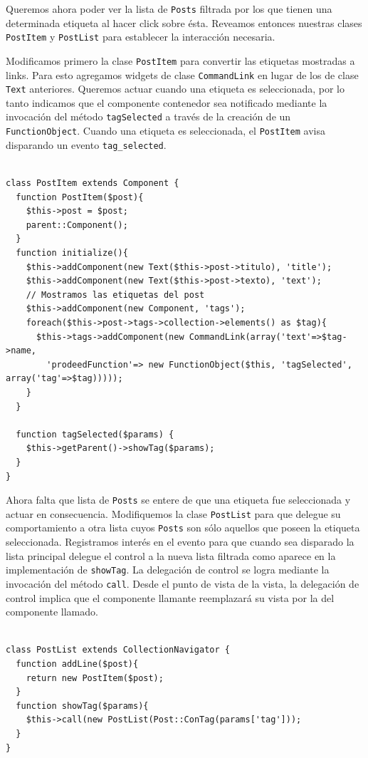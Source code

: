 Queremos ahora poder ver la lista de \verb"Posts" filtrada por los que tienen una determinada etiqueta al hacer click sobre ésta. Reveamos entonces nuestras clases \verb"PostItem" y \verb"PostList" para establecer la interacción necesaria.

Modificamos primero la clase \verb"PostItem" para convertir las etiquetas mostradas a links. Para esto agregamos widgets de clase \verb"CommandLink" en lugar de los de clase \verb"Text" anteriores. Queremos actuar cuando una etiqueta es seleccionada, por lo tanto indicamos que el componente contenedor sea notificado mediante la invocación del método \verb"tagSelected" a través de la creación de un \verb"FunctionObject". Cuando una etiqueta es seleccionada, el \verb"PostItem" avisa disparando  un evento \verb"tag_selected".

\begin{verbatim}

class PostItem extends Component {
  function PostItem($post){
    $this->post = $post;
    parent::Component();
  }
  function initialize(){
    $this->addComponent(new Text($this->post->titulo), 'title');
    $this->addComponent(new Text($this->post->texto), 'text');
    // Mostramos las etiquetas del post
    $this->addComponent(new Component, 'tags');
    foreach($this->post->tags->collection->elements() as $tag){
      $this->tags->addComponent(new CommandLink(array('text'=>$tag->name,
        'prodeedFunction'=> new FunctionObject($this, 'tagSelected', array('tag'=>$tag)))));
    }
  }

  function tagSelected($params) {
    $this->getParent()->showTag($params);
  }
}

\end{verbatim}

Ahora falta que lista de \verb"Posts" se entere de que una etiqueta fue seleccionada y actuar en consecuencia. Modifiquemos la clase \verb"PostList" para que delegue su comportamiento a otra lista cuyos \verb"Posts" son sólo aquellos que poseen la etiqueta seleccionada. Registramos interés en el evento para que cuando sea disparado la lista principal delegue el control a la nueva lista filtrada como aparece en la implementación de \verb"showTag". La delegación de control se logra mediante la invocación del método \verb"call". Desde el punto de vista de la vista, la delegación de control implica que el componente llamante reemplazará su vista por la del componente llamado.

\begin{verbatim}

class PostList extends CollectionNavigator {
  function addLine($post){
    return new PostItem($post);
  }
  function showTag($params){
    $this->call(new PostList(Post::ConTag(params['tag']));
  }
}

\end{verbatim}


